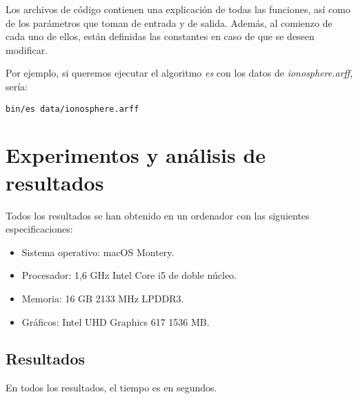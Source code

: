 \documentclass[11pt,a4paper]{article}
\begin{document}
Los archivos de código contienen una explicación de todas las funciones, así como de los parámetros que toman de entrada y de salida. Además, al comienzo de cada uno de ellos, están definidas las constantes en caso de que se deseen modificar.

Por ejemplo, si queremos ejecutar el algoritmo \emph{es} con los datos de \emph{ionosphere.arff}, sería:
\begin{verbatim}
bin/es data/ionosphere.arff
\end{verbatim}

\newpage
\section{Experimentos y análisis de resultados}
Todos los resultados se han obtenido en un ordenador con las siguientes especificaciones:
\begin{itemize}
\item Sistema operativo: macOS Montery.
\item Procesador: 1,6 GHz Intel Core i5 de doble núcleo.
\item Memoria: 16 GB 2133 MHz LPDDR3.
\item Gráficos: Intel UHD Graphics 617 1536 MB.
\end{itemize}

\subsection{Resultados}

En todos los resultados, el tiempo es en segundos.
\end{document}
